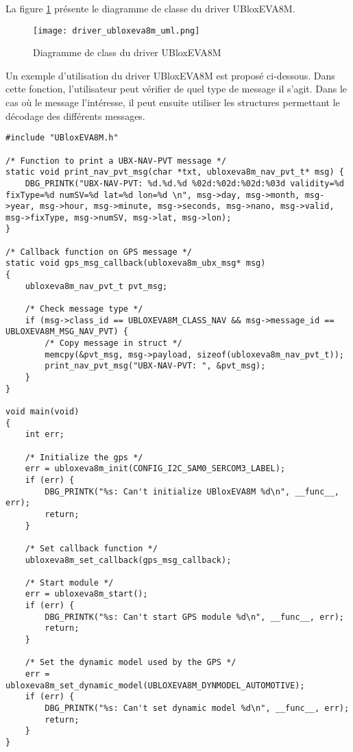 La figure \ref{fig:driver_ubloxeva8m_uml} présente le diagramme de classe du driver UBloxEVA8M.

\begin{figure}[htb]
\centering 
\texttt{[image: driver\_ubloxeva8m\_uml.png]} 
\caption{Diagramme de class du driver UBloxEVA8M}
\label{fig:driver_ubloxeva8m_uml}
\end{figure}

Un exemple d'utilisation du driver UBloxEVA8M est proposé ci-dessous.  Dans cette fonction, l'utilisateur peut vérifier de quel type de message il s'agit. Dans le cas où le message l'intéresse, il peut ensuite utiliser les structures permettant le décodage des différents messages.

\begin{lstlisting}[style=CStyle]
#include "UBloxEVA8M.h"

/* Function to print a UBX-NAV-PVT message */
static void print_nav_pvt_msg(char *txt, ubloxeva8m_nav_pvt_t* msg) {
	DBG_PRINTK("UBX-NAV-PVT: %d.%d.%d %02d:%02d:%02d:%03d validity=%d fixType=%d numSV=%d lat=%d lon=%d \n", msg->day, msg->month, msg->year, msg->hour, msg->minute, msg->seconds, msg->nano, msg->valid, msg->fixType, msg->numSV, msg->lat, msg->lon);
}

/* Callback function on GPS message */
static void gps_msg_callback(ubloxeva8m_ubx_msg* msg)
{
	ubloxeva8m_nav_pvt_t pvt_msg;
	
	/* Check message type */
	if (msg->class_id == UBLOXEVA8M_CLASS_NAV && msg->message_id == UBLOXEVA8M_MSG_NAV_PVT) {
		/* Copy message in struct */
		memcpy(&pvt_msg, msg->payload, sizeof(ubloxeva8m_nav_pvt_t));
		print_nav_pvt_msg("UBX-NAV-PVT: ", &pvt_msg);
	}
}

void main(void)
{
	int err;

	/* Initialize the gps */
	err = ubloxeva8m_init(CONFIG_I2C_SAM0_SERCOM3_LABEL);
	if (err) {
		DBG_PRINTK("%s: Can't initialize UBloxEVA8M %d\n", __func__, err);
		return;
	}

	/* Set callback function */
	ubloxeva8m_set_callback(gps_msg_callback);

	/* Start module */
	err = ubloxeva8m_start();
	if (err) {
		DBG_PRINTK("%s: Can't start GPS module %d\n", __func__, err);
		return;
	}

	/* Set the dynamic model used by the GPS */
	err = ubloxeva8m_set_dynamic_model(UBLOXEVA8M_DYNMODEL_AUTOMOTIVE);
	if (err) {
		DBG_PRINTK("%s: Can't set dynamic model %d\n", __func__, err);
		return;
	}
}
\end{lstlisting}

